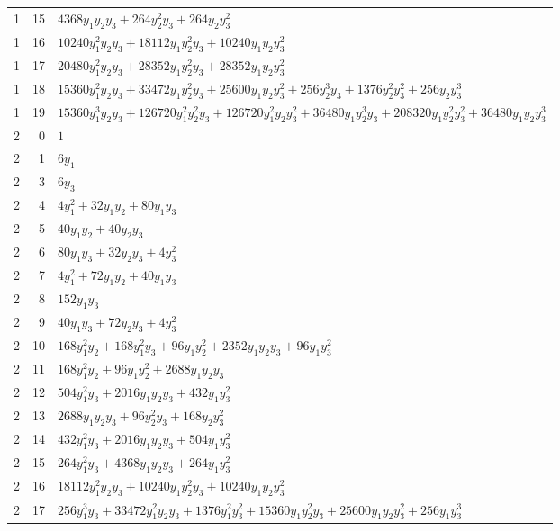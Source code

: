 \documentclass[10pt,a4paper]{article}
\begin{document}
{\begin{longtable}{rrp{125mm}}
1 & 15 & $4368 y_{1} y_{2} y_{3} + 264 y_{2}^{2} y_{3} + 264 y_{2} y_{3}^{2}$\\
1 & 16 & $10240 y_{1}^{2} y_{2} y_{3} + 18112 y_{1} y_{2}^{2} y_{3} + 10240 y_{1} y_{2} y_{3}^{2}$\\
1 & 17 & $20480 y_{1}^{2} y_{2} y_{3} + 28352 y_{1} y_{2}^{2} y_{3} + 28352 y_{1} y_{2} y_{3}^{2}$\\
1 & 18 & $15360 y_{1}^{2} y_{2} y_{3} + 33472 y_{1} y_{2}^{2} y_{3} + 25600 y_{1} y_{2} y_{3}^{2} + 256 y_{2}^{3} y_{3} + 1376 y_{2}^{2} y_{3}^{2} + 256 y_{2} y_{3}^{3}$\\
1 & 19 & $15360 y_{1}^{3} y_{2} y_{3} + 126720 y_{1}^{2} y_{2}^{2} y_{3} + 126720 y_{1}^{2} y_{2} y_{3}^{2} + 36480 y_{1} y_{2}^{3} y_{3} + 208320 y_{1} y_{2}^{2} y_{3}^{2} + 36480 y_{1} y_{2} y_{3}^{3}$\\
2 & 0 & $1$\\
2 & 1 & $6 y_{1}$\\
2 & 3 & $6 y_{3}$\\
2 & 4 & $4 y_{1}^{2} + 32 y_{1} y_{2} + 80 y_{1} y_{3}$\\
2 & 5 & $40 y_{1} y_{2} + 40 y_{2} y_{3}$\\
2 & 6 & $80 y_{1} y_{3} + 32 y_{2} y_{3} + 4 y_{3}^{2}$\\
2 & 7 & $4 y_{1}^{2} + 72 y_{1} y_{2} + 40 y_{1} y_{3}$\\
2 & 8 & $152 y_{1} y_{3}$\\
2 & 9 & $40 y_{1} y_{3} + 72 y_{2} y_{3} + 4 y_{3}^{2}$\\
2 & 10 & $168 y_{1}^{2} y_{2} + 168 y_{1}^{2} y_{3} + 96 y_{1} y_{2}^{2} + 2352 y_{1} y_{2} y_{3} + 96 y_{1} y_{3}^{2}$\\
2 & 11 & $168 y_{1}^{2} y_{2} + 96 y_{1} y_{2}^{2} + 2688 y_{1} y_{2} y_{3}$\\
2 & 12 & $504 y_{1}^{2} y_{3} + 2016 y_{1} y_{2} y_{3} + 432 y_{1} y_{3}^{2}$\\
2 & 13 & $2688 y_{1} y_{2} y_{3} + 96 y_{2}^{2} y_{3} + 168 y_{2} y_{3}^{2}$\\
2 & 14 & $432 y_{1}^{2} y_{3} + 2016 y_{1} y_{2} y_{3} + 504 y_{1} y_{3}^{2}$\\
2 & 15 & $264 y_{1}^{2} y_{3} + 4368 y_{1} y_{2} y_{3} + 264 y_{1} y_{3}^{2}$\\
2 & 16 & $18112 y_{1}^{2} y_{2} y_{3} + 10240 y_{1} y_{2}^{2} y_{3} + 10240 y_{1} y_{2} y_{3}^{2}$\\
2 & 17 & $256 y_{1}^{3} y_{3} + 33472 y_{1}^{2} y_{2} y_{3} + 1376 y_{1}^{2} y_{3}^{2} + 15360 y_{1} y_{2}^{2} y_{3} + 25600 y_{1} y_{2} y_{3}^{2} + 256 y_{1} y_{3}^{3}$\\

\end{longtable}}
\end{document}
